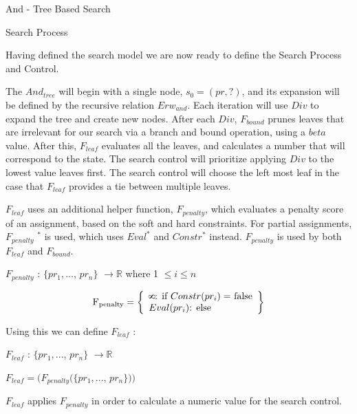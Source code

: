 \documentclass[10pt]{article}
\def\infinity{\rotatebox{90}{8}}
\begin{document}
{\centering 
\Huge And - Tree Based Search
\bigskip

\huge Search Process
\par}

\bigskip
\bigskip

Having defined the search model we are now ready to define the Search Process and Control.

\bigskip

The $And_{tree}$ will begin with a single node, $s_0 = (pr, ?)$, and its expansion will be defined by the recursive relation $Erw_{and}$. Each iteration will use $Div$ to expand the tree and create new nodes. After each $Div$, $F_{bound}$ prunes leaves that are irrelevant for our search via a branch and bound operation, using a $beta$ value. After this, $F_{leaf}$  evaluates all the leaves, and calculates a number that will correspond to the state. The search control will prioritize applying $Div$ to the lowest value leaves first. The search control will choose the left most leaf in the case that $F_{leaf}$ provides a tie between multiple leaves.
\bigskip
\bigskip

$F_{leaf}$ uses an additional helper function, $F_{penalty}$, which evaluates a penalty score of an assignment, based on the soft and hard constraints. For partial assignments, $F_{penalty}$ $^*$ is used, which uses $Eval^*$ and $Constr^*$ instead. $F_{penalty}$ is used by both $F_{leaf}$ and $F_{bound}$.

\bigskip
$F_{penalty}$ : $\{pr_1, ...$, $pr_n \} $  $ \to \mathbb{R} $    where 1 $\leq i\leq n$



 \[
          \text{F\textsubscript{penalty}} = \left\{\begin{array}{ll}
            \infinity $: 	 if $Constr(pr_i)=$ false$ \\
            Eval(pr_i) $: 	 else$\\
            
            \end{array}\right\}
      \]



 
\bigskip
Using this we can define $F_{leaf}$ : 
\bigskip

$F_{leaf}$ : $\{pr_1, ...$, $pr_n \} $  $ \to \mathbb{R} $  

$F_{leaf} = (F_{penalty}(\{pr_1, ...$, $pr_n \}))$

\bigskip

$F_{leaf}$ applies $F_{penalty}$ in order to calculate a numeric value for the search control.
\end{document}
